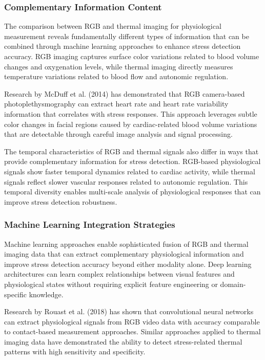 \documentclass[11pt,a4paper]{article}
\begin{document}
\subsubsection{Complementary Information Content}

The comparison between RGB and thermal imaging for physiological measurement reveals fundamentally different types of
information that can be combined through machine learning approaches to enhance stress detection accuracy. RGB imaging
captures surface color variations related to blood volume changes and oxygenation levels, while thermal imaging directly
measures temperature variations related to blood flow and autonomic regulation.

Research by McDuff et al. (2014) has demonstrated that RGB camera-based photoplethysmography can extract heart rate and
heart rate variability information that correlates with stress responses. This approach leverages subtle color changes
in facial regions caused by cardiac-related blood volume variations that are detectable through careful image analysis
and signal processing.

The temporal characteristics of RGB and thermal signals also differ in ways that provide complementary information for
stress detection. RGB-based physiological signals show faster temporal dynamics related to cardiac activity, while
thermal signals reflect slower vascular responses related to autonomic regulation. This temporal diversity enables
multi-scale analysis of physiological responses that can improve stress detection robustness.

\subsubsection{Machine Learning Integration Strategies}

Machine learning approaches enable sophisticated fusion of RGB and thermal imaging data that can extract complementary
physiological information and improve stress detection accuracy beyond either modality alone. Deep learning
architectures can learn complex relationships between visual features and physiological states without requiring
explicit feature engineering or domain-specific knowledge.

Research by Rouast et al. (2018) has shown that convolutional neural networks can extract physiological signals from RGB
video data with accuracy comparable to contact-based measurement approaches. Similar approaches applied to thermal
imaging data have demonstrated the ability to detect stress-related thermal patterns with high sensitivity and
specificity.
\end{document}

